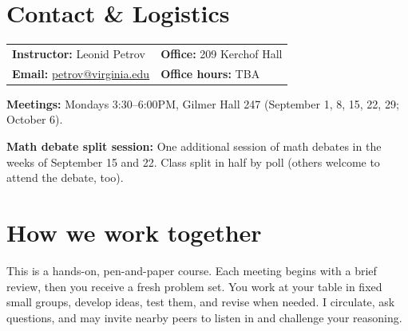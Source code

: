 \documentclass[oneside,11pt]{amsart}
\begin{document}
\newpage
\section{Contact \& Logistics}

\noindent
\begin{tabular}{ll}
\textbf{Instructor:} Leonid Petrov &\qquad \qquad \qquad\textbf{Office:} 209 Kerchof Hall \\
\textbf{Email:} \href{mailto:petrov@virginia.edu}{petrov@virginia.edu} & \qquad \qquad \qquad\textbf{Office hours:} TBA \\
\end{tabular}

\vspace{4pt}

\noindent\textbf{Meetings:} 
Mondays 3:30--6:00PM, Gilmer Hall 247
(September 1, 8, 15, 22, 29; October 6).

\medskip
\noindent
\textbf{Math debate split session:} One additional session of math debates in the weeks of September 15 and 22. 
Class split in half by poll (others welcome to attend the debate, too).

\section{How we work together}

This is a hands-on, pen-and-paper course. Each meeting begins with 
a brief review, then you receive
a fresh problem set. You work at your table in fixed small groups, develop ideas, test them, and revise when needed. I circulate, ask questions, and may invite nearby peers to listen in and challenge your reasoning.
\end{document}
